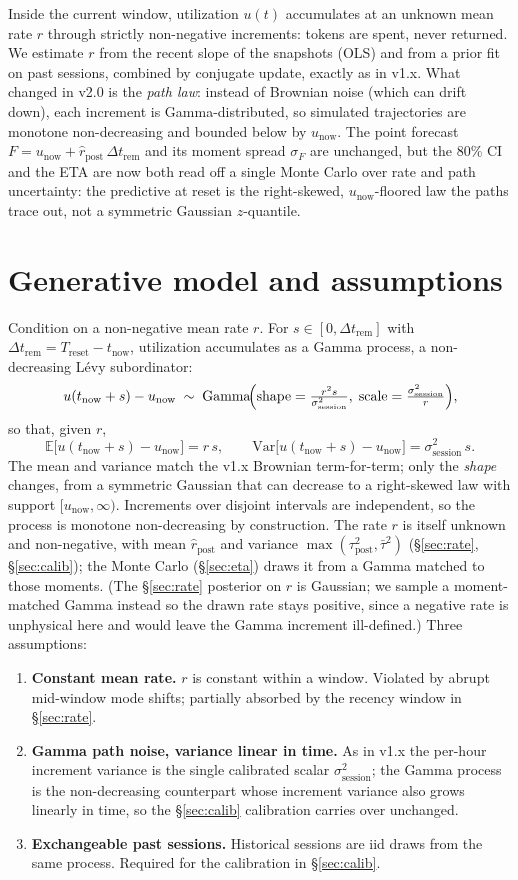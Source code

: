 \documentclass[11pt]{article}
\newcommand{\rpost}{\hat r_{\text{post}}}
\newcommand{\taupostsq}{\tau_{\text{post}}^2}
\newcommand{\sigsessionsq}{\sigma_{\text{session}}^2}
\newcommand{\unow}{u_{\text{now}}}
\newcommand{\tnow}{t_{\text{now}}}
\newcommand{\Treset}{T_{\text{reset}}}
\newcommand{\Dtrem}{\Delta t_{\text{rem}}}
\begin{document}
Inside the current window, utilization $u(t)$ accumulates at an unknown mean
rate $r$ through strictly non-negative increments: tokens are spent, never
returned. We estimate $r$ from the recent slope of the snapshots (OLS) and
from a prior fit on past sessions, combined by conjugate update, exactly as in
v1.x. What changed in v2.0 is the \emph{path law}: instead of Brownian noise
(which can drift down), each increment is Gamma-distributed, so simulated
trajectories are monotone non-decreasing and bounded below by $\unow$. The
point forecast $F = \unow + \rpost\,\Dtrem$ and its moment spread $\sigma_F$
are unchanged, but the 80\% CI and the ETA are now both read off a single Monte
Carlo over rate and path uncertainty: the predictive at reset is the
right-skewed, $\unow$-floored law the paths trace out, not a symmetric Gaussian
$z$-quantile.

\section{Generative model and assumptions}

Condition on a non-negative mean rate $r$. For $s \in [0, \Dtrem]$ with
$\Dtrem = \Treset - \tnow$, utilization accumulates as a Gamma process, a
non-decreasing Lévy subordinator:
\[
  u(\tnow + s) - \unow \;\sim\; \mathrm{Gamma}\!\Bigl(
    \text{shape} = \tfrac{r^2 s}{\sigsessionsq},\;
    \text{scale} = \tfrac{\sigsessionsq}{r}\Bigr),
\]
so that, given $r$,
\[
  \mathbb{E}\bigl[u(\tnow+s) - \unow\bigr] = r\,s,
  \qquad
  \mathrm{Var}\bigl[u(\tnow+s) - \unow\bigr] = \sigsessionsq\,s.
\]
The mean and variance match the v1.x Brownian term-for-term; only the
\emph{shape} changes, from a symmetric Gaussian that can decrease to a
right-skewed law with support $[\unow, \infty)$. Increments over disjoint
intervals are independent, so the process is monotone non-decreasing by
construction. The rate $r$ is itself unknown and non-negative, with mean
$\rpost$ and variance $\max(\taupostsq, \bar\tau^2)$
(\S\ref{sec:rate}, \S\ref{sec:calib}); the Monte Carlo (\S\ref{sec:eta}) draws
it from a Gamma matched to those moments. (The \S\ref{sec:rate} posterior on
$r$ is Gaussian; we sample a moment-matched Gamma instead so the drawn rate
stays positive, since a negative rate is unphysical here and would leave the
Gamma increment ill-defined.) Three assumptions:

\begin{enumerate}
  \item \textbf{Constant mean rate.} $r$ is constant within a window.
    Violated by abrupt mid-window mode shifts; partially absorbed by the
    recency window in \S\ref{sec:rate}.
  \item \textbf{Gamma path noise, variance linear in time.} As in v1.x the
    per-hour increment variance is the single calibrated scalar
    $\sigsessionsq$; the Gamma process is the non-decreasing counterpart whose
    increment variance also grows linearly in time, so the \S\ref{sec:calib}
    calibration carries over unchanged.
  \item \textbf{Exchangeable past sessions.} Historical sessions are iid
    draws from the same process. Required for the calibration in
    \S\ref{sec:calib}.
\end{enumerate}
\end{document}
